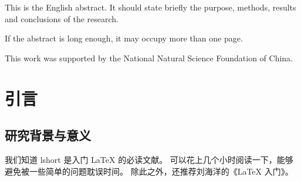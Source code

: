 \documentclass[official]{ncubachelor}
\begin{document}
\maketitle

\makedecaut

\frontmatter

\begin{abstract}
这是中文摘要。摘要应扼要说明研究目的、方法、结果和结论，
内容为小四号宋体、两端对齐、行距 1.35 倍、行首缩进 2 个汉字字符。

如果摘要较长，可以分段书写，也可以写到第二页。

本文得到了国家自然科学基金项目的资助。
\end{abstract}

\begin{abstract*}
This is the English abstract. It should state briefly the purpose,
methods, results and conclusions of the research.

If the abstract is long enough, it may occupy more than one page.

This work was supported by the National Natural Science Foundation
of China.
\end{abstract*}

\tableofcontents

\mainmatter

\chapter{引言}\label{chap:intro}


\section{研究背景与意义}\label{sec:background}

我们知道 lshort\cite{lshortcn} 是入门 \LaTeX{} 的必读文献。
可以花上几个小时阅读一下，能够避免被一些简单的问题耽误时间。
除此之外，还推荐刘海洋的《\LaTeX{} 入门》。
\end{document}
